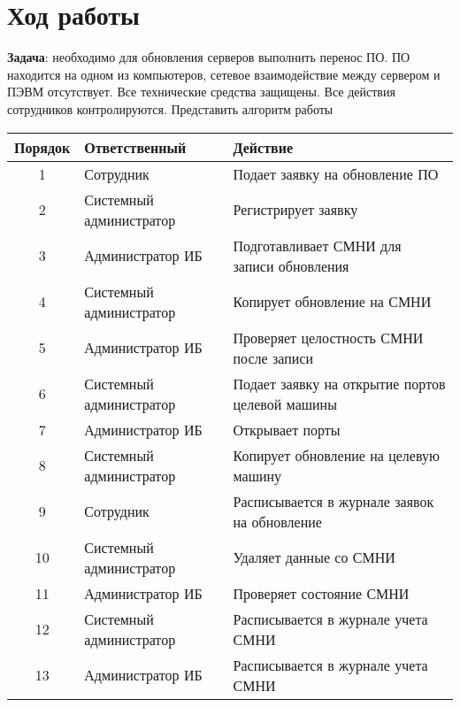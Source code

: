 \section{Ход работы}

\textbf{Задача}: необходимо для обновления серверов выполнить перенос ПО. ПО находится на одном из компьютеров, сетевое взаимодействие между сервером и ПЭВМ отсутствует. Все технические средства защищены. Все действия сотрудников контролируются. Представить алгоритм работы

\begin{table}[H]
	\centering
	\begin{tabular}{|c|p{6cm}|p{8cm}|}
		\hline
		Порядок & Ответственный           & Действие                                        \\ \hline
		1       & Сотрудник               & Подает заявку на обновление ПО                  \\ \hline
		2       & Системный администратор & Регистрирует заявку                             \\ \hline
		3       & Администратор ИБ        & Подготавливает СМНИ для записи обновления       \\ \hline
		4       & Системный администратор & Копирует обновление на СМНИ                     \\ \hline
		5       & Администратор ИБ        & Проверяет целостность СМНИ после записи         \\ \hline
		6       & Системный администратор & Подает заявку на открытие портов целевой машины \\ \hline
		7       & Администратор ИБ        & Открывает порты                                 \\ \hline
		8       & Системный администратор & Копирует обновление на целевую машину           \\ \hline
		9       & Сотрудник               & Расписывается в журнале заявок на обновление    \\ \hline
		10      & Системный администратор & Удаляет данные со СМНИ                          \\ \hline
		11      & Администратор ИБ        & Проверяет состояние СМНИ                        \\ \hline
		12      & Системный администратор & Расписывается в журнале учета СМНИ              \\ \hline
		13      & Администратор ИБ        & Расписывается в журнале учета СМНИ              \\ \hline
	\end{tabular}
\end{table}